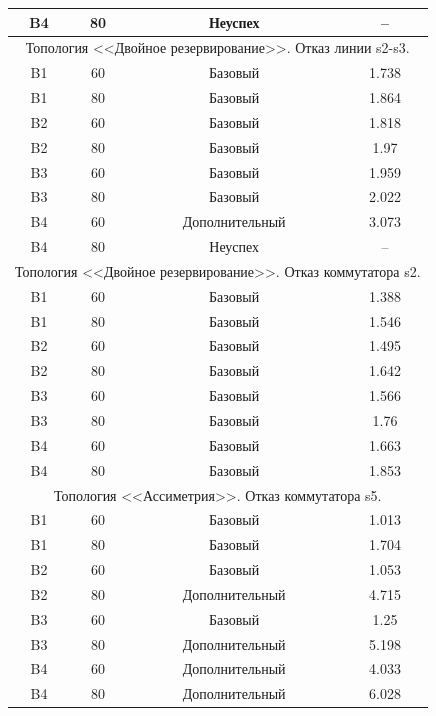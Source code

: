 \documentclass[12pt, a4paper]{article}
\begin{document}
\begin{longtable}[c]{|c|c|c|c|}
		B4 & 80 & Неуспех & -- \\ \hline
		\multicolumn{4}{|c|}{Топология <<Двойное резервирование>>. Отказ линии s2-s3.} \\ \hline
		B1 & 60 & Базовый & 1.738 \\ \hline
		B1 & 80 & Базовый & 1.864 \\ \hline
		B2 & 60 & Базовый & 1.818 \\ \hline
		B2 & 80 & Базовый & 1.97 \\ \hline
		B3 & 60 & Базовый & 1.959 \\ \hline
		B3 & 80 & Базовый & 2.022 \\ \hline
		B4 & 60 & Дополнительный & 3.073 \\ \hline
		B4 & 80 & Неуспех & -- \\ \hline
		\multicolumn{4}{|c|}{Топология <<Двойное резервирование>>. Отказ коммутатора s2.} \\ \hline
		B1 & 60 & Базовый & 1.388 \\ \hline
		B1 & 80 & Базовый & 1.546 \\ \hline
		B2 & 60 & Базовый & 1.495 \\ \hline
		B2 & 80 & Базовый & 1.642 \\ \hline
		B3 & 60 & Базовый & 1.566 \\ \hline
		B3 & 80 & Базовый & 1.76 \\ \hline
		B4 & 60 & Базовый & 1.663 \\ \hline
		B4 & 80 & Базовый & 1.853 \\ \hline
		\multicolumn{4}{|c|}{Топология <<Ассиметрия>>. Отказ коммутатора s5.} \\ \hline
		B1 & 60 & Базовый & 1.013 \\ \hline
		B1 & 80 & Базовый & 1.704 \\ \hline
		B2 & 60 & Базовый & 1.053 \\ \hline
		B2 & 80 & Дополнительный & 4.715 \\ \hline
		B3 & 60 & Базовый & 1.25 \\ \hline
		B3 & 80 & Дополнительный & 5.198 \\ \hline
		B4 & 60 & Дополнительный & 4.033 \\ \hline
		B4 & 80 & Дополнительный & 6.028 \\ \hline
		
\end{longtable}
\end{document}
